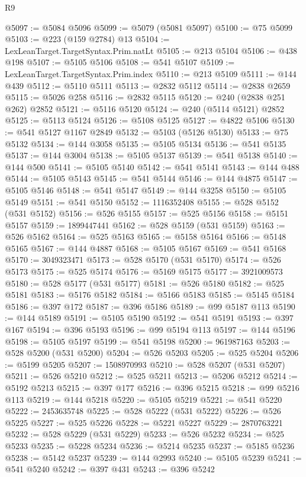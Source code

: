 \begin{lexlean}{R9}
\begin{coremodule}
@5097 := @5084 @5096
@5099 := @5079 (@5081 @5097)
@5100 := @75 @5099
@5103 := @223 (@159 @2784) @13
@5104 := LexLeanTarget.TargetSyntax.Prim.natLt
@5105 := @213 @5104
@5106 := @438 @198
@5107 := @5105 @5106
@5108 := @541 @5107
@5109 := LexLeanTarget.TargetSyntax.Prim.index
@5110 := @213 @5109
@5111 := @144 @439
@5112 := @5110 @5111
@5113 := @2832 @5112
@5114 := @2838 @2659
@5115 := @5026 @258
@5116 := @2832 @5115
@5120 := @240 (@2838 @251 @262) @2852
@5121 := @5116 @5120
@5124 := @240 (@5114 @5121) @2852
@5125 := @5113 @5124
@5126 := @5108 @5125
@5127 := @4822 @5106
@5130 := @541 @5127 @1167 @2849
@5132 := @5103 (@5126 @5130)
@5133 := @75 @5132
@5134 := @144 @3058
@5135 := @5105 @5134
@5136 := @541 @5135
@5137 := @144 @3004
@5138 := @5105 @5137
@5139 := @541 @5138
@5140 := @144 @500
@5141 := @5105 @5140
@5142 := @541 @5141
@5143 := @144 @488
@5144 := @5105 @5143
@5145 := @541 @5144
@5146 := @144 @4875
@5147 := @5105 @5146
@5148 := @541 @5147
@5149 := @144 @3258
@5150 := @5105 @5149
@5151 := @541 @5150
@5152 := 1116352408
@5155 := @528 @5152 (@531 @5152)
@5156 := @526 @5155
@5157 := @525 @5156
@5158 := @5151 @5157
@5159 := 1899447441
@5162 := @528 @5159 (@531 @5159)
@5163 := @526 @5162
@5164 := @525 @5163
@5165 := @5158 @5164
@5166 := @5148 @5165
@5167 := @144 @4887
@5168 := @5105 @5167
@5169 := @541 @5168
@5170 := 3049323471
@5173 := @528 @5170 (@531 @5170)
@5174 := @526 @5173
@5175 := @525 @5174
@5176 := @5169 @5175
@5177 := 3921009573
@5180 := @528 @5177 (@531 @5177)
@5181 := @526 @5180
@5182 := @525 @5181
@5183 := @5176 @5182
@5184 := @5166 @5183
@5185 := @5145 @5184
@5186 := @397 @172
@5187 := @396 @5186
@5189 := @99 @5187 @113
@5190 := @144 @5189
@5191 := @5105 @5190
@5192 := @541 @5191
@5193 := @397 @167
@5194 := @396 @5193
@5196 := @99 @5194 @113
@5197 := @144 @5196
@5198 := @5105 @5197
@5199 := @541 @5198
@5200 := 961987163
@5203 := @528 @5200 (@531 @5200)
@5204 := @526 @5203
@5205 := @525 @5204
@5206 := @5199 @5205
@5207 := 1508970993
@5210 := @528 @5207 (@531 @5207)
@5211 := @526 @5210
@5212 := @525 @5211
@5213 := @5206 @5212
@5214 := @5192 @5213
@5215 := @397 @177
@5216 := @396 @5215
@5218 := @99 @5216 @113
@5219 := @144 @5218
@5220 := @5105 @5219
@5221 := @541 @5220
@5222 := 2453635748
@5225 := @528 @5222 (@531 @5222)
@5226 := @526 @5225
@5227 := @525 @5226
@5228 := @5221 @5227
@5229 := 2870763221
@5232 := @528 @5229 (@531 @5229)
@5233 := @526 @5232
@5234 := @525 @5233
@5235 := @5228 @5234
@5236 := @5214 @5235
@5237 := @5185 @5236
@5238 := @5142 @5237
@5239 := @144 @2993
@5240 := @5105 @5239
@5241 := @541 @5240
@5242 := @397 @431
@5243 := @396 @5242

\end{coremodule}
\end{lexlean}
